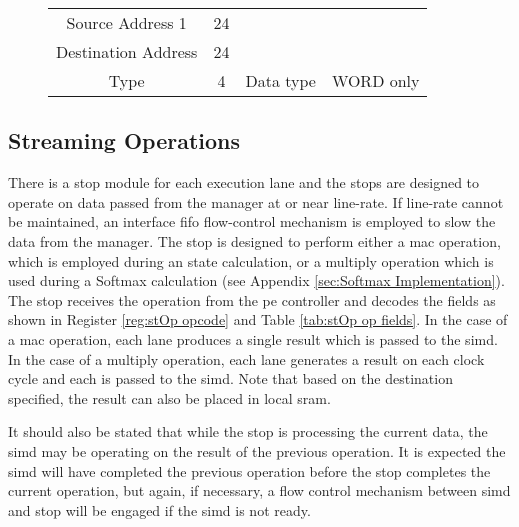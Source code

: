 \begin{figure}[h]
\begin{minipage}{1\textwidth}
\begin{minipage}{1\textwidth}
\begin{minipage}[t]{0.75\textwidth}
\begin{adjustbox}{width=1\textwidth}
\begin{tabular}{ |c|c|c|c|  }
              Source Address 1    & 24 &                                       &                                        \\\cline{1-2}
              Destination Address & 24 &                                       &                                        \\\cline{1-4}
              Type                & 4  & Data type                             & WORD only                              \\\cline{1-4}
              \hline
            \end{tabular}
        \end{adjustbox}
      \end{minipage}
    \end{minipage}
    \label{tab:stOp pointer memory}
  \end{minipage}
\end{figure}


\subsection{Streaming Operations}
\label{sec:stOps}

There is a \ac{stop} module for each execution lane and the \acp{stop} are designed to operate on data passed from the manager at or near line-rate. 
If line-rate cannot be maintained, an interface \ac{fifo} flow-control mechanism is employed to slow the data from the manager.
The \ac{stop} is designed to perform either a \ac{mac} operation, which is employed during \ac{an} state calculation, or a multiply operation which is used during a Softmax \cite{wikipedia_softmax} calculation (see Appendix \ref{sec:Softmax Implementation}).
The \ac{stop} receives the operation from the \ac{pe} controller and decodes the fields as shown in Register \ref{reg:stOp opcode} and Table \ref{tab:stOp op fields}.
In the case of a \ac{mac} operation, each lane produces a single result which is passed to the \ac{simd}.
In the case of a multiply operation, each lane generates a result on each clock cycle and each is passed to the \ac{simd}.
Note that based on the destination specified, the result can also be placed in local \ac{sram}.

It should also be stated that while the \ac{stop} is processing the current data, the \ac{simd} may be operating on the result of the previous operation. 
It is expected the \ac{simd} will have completed the previous operation before the \ac{stop} completes the current operation, but again, if necessary, a flow control mechanism between \ac{simd} and \ac{stop} will be engaged if the \ac{simd} is not ready.

